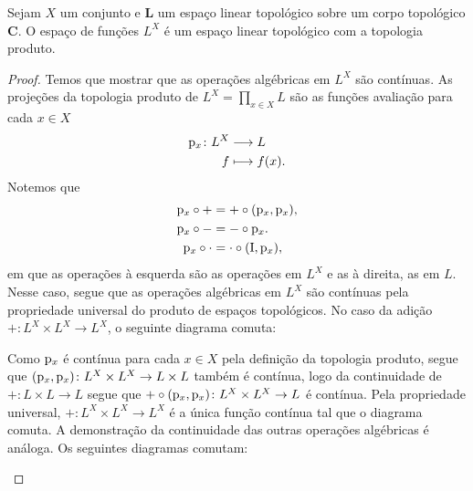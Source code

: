 \begin{proposition}
Sejam $X$ um conjunto e $\bm L$ um espaço linear topológico sobre um corpo topológico $\bm C$. O espaço de funções $L^X$ é um espaço linear topológico com a topologia produto.
\end{proposition}
\begin{proof}
Temos que mostrar que as operações algébricas em $L^X$ são contínuas. As projeções da topologia produto de $L^X = \prod_{x \in X} L$ são as funções avaliação para cada $x \in X$
	\begin{align*}
	{\mathrm{p}_x}\colon {L^X} &\longrightarrow {L} \\{f} &\longmapsto f(x).
	\end{align*}
Notemos que
	\begin{align*}
	\mathrm{p}_x \circ + &= + \circ (\mathrm{p}_x,\mathrm{p}_x),\\
	\mathrm{p}_x \circ - &= - \circ \mathrm{p}_x.\\
	\mathrm{p}_x \circ \cdot &= \cdot \circ (\mathrm{I},\mathrm{p}_x),
	\end{align*}
em que as operações à esquerda são as operações em $L^X$ e as à direita, as em $L$. Nesse caso, segue que as operações algébricas em $L^X$ são contínuas pela propriedade universal do produto de espaços topológicos. No caso da adição $+\colon L^X \times L^X \to L^X$, o seguinte diagrama comuta:
\begin{figure}
\centering
{}
\end{figure}
Como $\mathrm{p}_x$ é contínua para cada $x \in X$ pela definição da topologia produto, segue que $(\mathrm{p}_x,\mathrm{p}_x)\colon L^X \times L^X \to L \times L$ também é contínua, logo da continuidade de $+\colon L \times L \to L$ segue que $+ \circ (\mathrm{p}_x,\mathrm{p}_x)\colon L^X \times L^X \to L$ é contínua. Pela propriedade universal, $+\colon L^X \times L^X \to L^X$ é a única função contínua tal que o diagrama comuta. A demonstração da continuidade das outras operações algébricas é análoga. Os seguintes diagramas comutam:
\begin{figure}
\centering
{}
\hspace{3cm}
\end{figure}
\end{proof}

